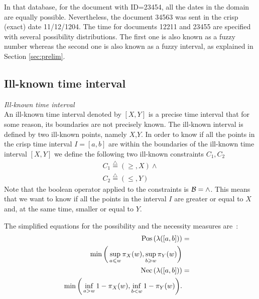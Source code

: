 In that database, for the document with ID=23454, all the dates in the domain are equally possible. Nevertheless, the document 34563 was sent in the crisp (exact) date 11/12/1204. The time for documents 12211 and 23455 are specified with several possibility distributions. The first one is also known as a fuzzy number whereas the second one is also known as a fuzzy interval, as explained in Section \ref{sec:prelim}.
 
 
 


\subsection{\label{subsec:ill-known-interval}Ill-known time interval}


\begin{definition}
\emph{Ill-known time interval}\\
An ill-known time interval denoted by $\left[X, Y\right]$ is a precise time interval that for some reason, its boundaries are not precisely known. The ill-known interval is defined by two ill-known points, namely $X$,$Y$.
In order to know if all the points in the crisp time interval $I=\left[a, b\right]$ are within the boundaries of the ill-known time interval $\left[X, Y\right]$ we define the following two ill-known constraints $C_{1}, C_{2}$ 
\begin{eqnarray}
C_1\stackrel{\triangle}{=}\left(\geq,X\right) \wedge \\
C_2\stackrel{\triangle}{=}\left(\leq,Y\right)
\end{eqnarray}
Note that the boolean operator applied to the constraints is $\operatorname*{\mathcal{B}}=\wedge$.
This means that we want to know if all the points in the interval $I$ are greater or equal to $X$ and, at the same time, smaller or equal to $Y$.
\end{definition}

The simplified equations for the possibility and the necessity measures are~\cite{Pons2011}:
\begin{eqnarray}
\label{eq:interval-pos}
\operatorname{Pos}\left(\lambda([a,b])\right)&=&\\
\nonumber
\min\bigg(\sup_{a\leqslant w}\pi_{X}(w),\sup_{b\geqslant w}\pi_{Y}(w)\bigg)\\
\label{eq:interval-nec}
\operatorname{Nec}\left(\lambda([a,b])\right)&=&\\
\nonumber
\min\bigg(\inf_{a>w}1-\pi_{X}(w),\inf_{b<w}1-\pi_{Y}(w)\bigg).
\end{eqnarray}




